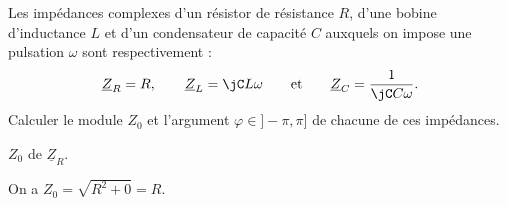 \reponse{\reponseF{}}

%



\finEntrainement






\hauteurLargeurCadreReponse		{6mm}{2.125cm}
\initialisationEntrainement

Les impédances complexes d'un résistor de résistance $R$, d'une bobine d'inductance $L$ et d'un condensateur de capacité $C$ auxquels on impose une pulsation $\omega$ sont respectivement : 
\[
\underline{Z}_R= R, \qquad \underline{Z}_L= \jC L \omega \qquad \text{et} \qquad \underline{Z}_C= \frac{1}{\jC C \omega}.
\]
Calculer le module $Z_0$ et l'argument $\varphi\in {]}-\pi, \pi{]}$ de chacune de ces impédances.
\debutEntrainement


\begin{enonce}
	$Z_0$ de $\underline{Z}_R$.
\end{enonce}


\begin{corrige}
On a $Z_0 = \sqrt{R^2 + 0} = R$.
\end{corrige}

